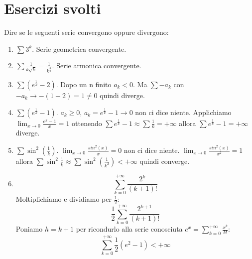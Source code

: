\chapter*{Esercizi svolti}
\begin{exercise}
    Dire se le seguenti serie convergono oppure divergono:
    \begin{enumerate}
        \item $\sum 3^k$. Serie geometrica convergente.
        \item $\sum \frac{1}{k\sqrt{k}}=\frac{1}{k^{\frac{3}{2}}}$. Serie armonica convergente.
        \item $\sum(e^{\frac{1}{k}}-2)$. Dopo un n finito $a_k<0$. Ma $\sum-a_k$ con $-a_k\to-(1-2)=1\neq0$ quindi diverge.
        \item $\sum (e^{\frac{1}{k}}-1)$. $a_k\geq0$, $a_k=e^{\frac{1}{k}}-1\to0$ non ci dice niente. Applichiamo $\lim_{x\to0}\frac{e^x-1}{x}=1$ ottenendo $\sum e^{\frac{1}{k}}-1\approx\sum\frac{1}{k}=+\infty$ allora $\sum e^{\frac{1}{k}}-1=+\infty$ diverge.
        \item $\sum \sin^2(\frac{1}{k})$. $\lim_{x\to0}\frac{sin^2(x)}{x}=0$ non ci dice niente. $\lim_{x\to0}\frac{sin^2(x)}{x^2}=1$ allora $\sum \sin^2\frac{1}{k}\approx\sum\sin^2(\frac{1}{k^2})<+\infty$ quindi converge.
        
        \item \begin{equation*}\sum^{+\infty}_{k=0}\frac{2^k}{(k+1)!}\end{equation*}
        Moltiplichiamo e dividiamo per $\frac{1}{2}$:
        \begin{equation*}\frac{1}{2}\sum^{+\infty}_{k=0}\frac{2^{k+1}}{(k+1)!}\end{equation*}
        Poniamo $h=k+1$ per ricondurlo alla serie conosciuta $e^x=\sum^{+\infty}_{k=0}\frac{x^k}{k!}$:
        \begin{equation*}\sum^{+\infty}_{k=0}\frac{1}{2}(e^2-1)<+\infty\end{equation*}
    \end{enumerate}
\end{exercise}

